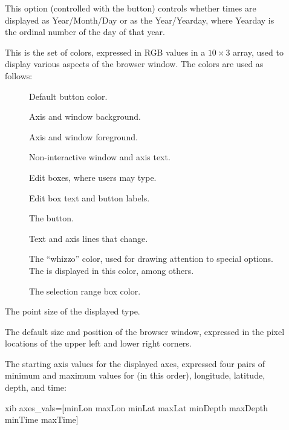 \begin{description}
\item[] This option (controlled with the
   button) controls whether times are displayed as
  Year/Month/Day or as the Year/Yearday, where Yearday is the ordinal
  number of the day of that year.
\item[] This is the set of colors, expressed in RGB
  values in a $10\times3$ array, used to display various aspects of
  the browser window.  The colors are used as follows:
\begin{description}
\item[] Default button color.
\item[] Axis and window background.
\item[] Axis and window foreground.
\item[] Non-interactive window and axis text. 
\item[] Edit boxes, where users may type.
\item[] Edit box text and button labels.
\item[] The  button.
\item[] Text and axis lines that change.
\item[] The ``whizzo'' color, used for drawing
  attention to special options.  The  is displayed in
  this color, among others.
\item[] The selection range box color.
\end{description}
\item[] The point size of the displayed type.
\item[] The default size and position of the browser
  window, expressed in the pixel locations of the upper left and lower
  right corners.
\item[] The starting axis values for the displayed
  axes, expressed four pairs of minimum and maximum values for (in
  this order), longitude, latitude, depth, and time:

\begin{vcode}{xib}
axes_vals=[minLon maxLon minLat maxLat minDepth maxDepth minTime maxTime]    
\end{vcode}


\end{description}
